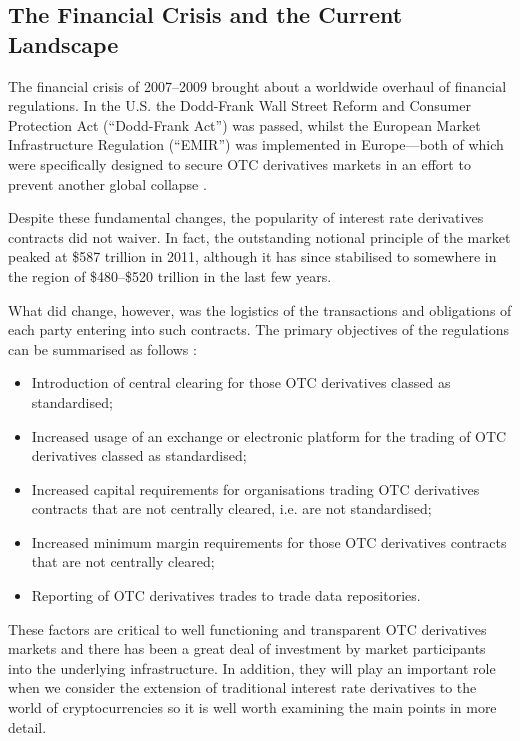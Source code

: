 \subsection{The Financial Crisis and the Current Landscape}
The financial crisis of 2007–2009 brought about a worldwide overhaul of financial regulations. In the U.S. the Dodd-Frank Wall Street Reform and Consumer Protection Act (``Dodd-Frank Act'') was passed, whilst the European Market Infrastructure Regulation (``EMIR'') was implemented in Europe––both of which were specifically designed to secure OTC derivatives markets in an effort to prevent another global collapse \citep{CFTC_Ch2_1}.

Despite these fundamental changes, the popularity of interest rate derivatives contracts did not waiver. In fact, the outstanding notional principle of the market peaked at \$587 trillion in 2011, although it has since stabilised to somewhere in the region of \$480–\$520 trillion in the last few years.

\FloatBarrier

What did change, however, was the logistics of the transactions and obligations of each party entering into such contracts. The primary objectives of the regulations can be summarised as follows \citep{EuroCom_Ch2_1}:
\begin{itemize}
    \item Introduction of central clearing for those OTC derivatives classed as standardised;
    \item Increased usage of an exchange or electronic platform for the trading of OTC derivatives classed as standardised;
    \item Increased capital requirements for organisations trading OTC derivatives contracts that are not centrally cleared, i.e. are not standardised;
    \item Increased minimum margin requirements for those OTC derivatives contracts that are not centrally cleared;
    \item Reporting of OTC derivatives trades to trade data repositories.
\end{itemize}

These factors are critical to well functioning and transparent OTC derivatives markets and there has been a great deal of investment by market participants into the underlying infrastructure. In addition, they will play an important role when we consider the extension of traditional interest rate derivatives to the world of cryptocurrencies so it is well worth examining the main points in more detail. 

